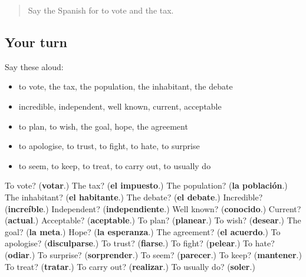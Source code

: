 \begin{quote}
Say the Spanish for to vote and the tax.
\end{quote}

\subsection*{Your turn}
Say these aloud:

\begin{itemize}
\raggedright
  \item to vote, the tax, the population, the inhabitant, the debate
  \item incredible, independent, well known, current, acceptable
  \item to plan, to wish, the goal, hope, the agreement
  \item to apologise, to trust, to fight, to hate, to surprise
  \item to seem, to keep, to treat, to carry out, to usually do
\end{itemize}

\begin{tcolorbox}[breakable,colback=teal!4,colframe=teal!35!black,title={Before you move on}]
To vote? (\textbf{votar}.) The tax? (\textbf{el impuesto}.) The population? (\textbf{la población}.) The inhabitant? (\textbf{el habitante}.) The debate? (\textbf{el debate}.) Incredible? (\textbf{increíble}.) Independent? (\textbf{independiente}.) Well known? (\textbf{conocido}.) Current? (\textbf{actual}.) Acceptable? (\textbf{aceptable}.) To plan? (\textbf{planear}.) To wish? (\textbf{desear}.) The goal? (\textbf{la meta}.) Hope? (\textbf{la esperanza}.) The agreement? (\textbf{el acuerdo}.) To apologise? (\textbf{disculparse}.) To trust? (\textbf{fiarse}.) To fight? (\textbf{pelear}.) To hate? (\textbf{odiar}.) To surprise? (\textbf{sorprender}.) To seem? (\textbf{parecer}.) To keep? (\textbf{mantener}.) To treat? (\textbf{tratar}.) To carry out? (\textbf{realizar}.) To usually do? (\textbf{soler}.)
\end{tcolorbox}
